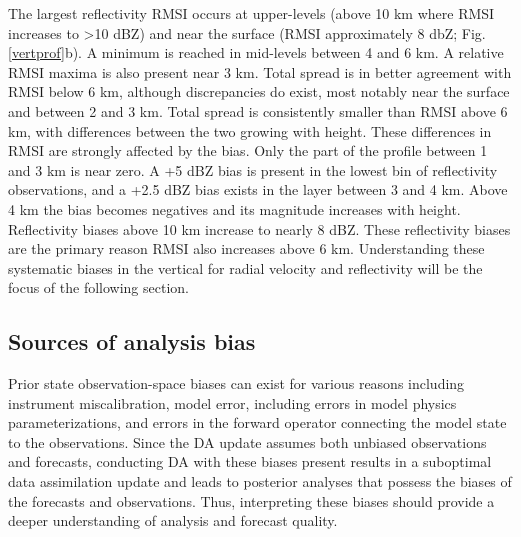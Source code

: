The largest reflectivity RMSI occurs at upper-levels (above 10 km where RMSI increases to \textgreater 10 dBZ) and near the surface (RMSI approximately 8 dbZ; Fig. \ref{vertprof}b). A minimum is reached in mid-levels between 4 and 6 km. A relative RMSI maxima is also present near 3 km. Total spread is in better agreement with RMSI below 6 km, although discrepancies do exist, most notably near the surface and between 2 and 3 km. Total spread is consistently smaller than RMSI above 6 km, with differences between the two growing with height. These differences in RMSI are strongly affected by the bias. Only the part of the profile between 1 and 3 km is near zero. A +5 dBZ bias is present in the lowest bin of reflectivity observations, and a +2.5 dBZ bias exists in the layer between 3 and 4 km. Above 4 km the bias becomes negatives and its magnitude increases with height. Reflectivity biases above 10 km increase to nearly 8 dBZ. These reflectivity biases are the primary reason RMSI also increases above 6 km. Understanding these systematic biases in the vertical for radial velocity and reflectivity will be the focus of the following section.

\subsection{Sources of analysis bias}
\label{biassection}
Prior state observation-space biases can exist for various reasons including instrument miscalibration, model error, including errors in model physics parameterizations, and errors in the forward operator connecting the model state to the observations. Since the DA update assumes both unbiased observations and forecasts, conducting DA with these biases present results in a suboptimal data assimilation update and leads to posterior analyses that possess the biases of the forecasts and observations. Thus, interpreting these biases should provide a deeper understanding of analysis and forecast quality.

